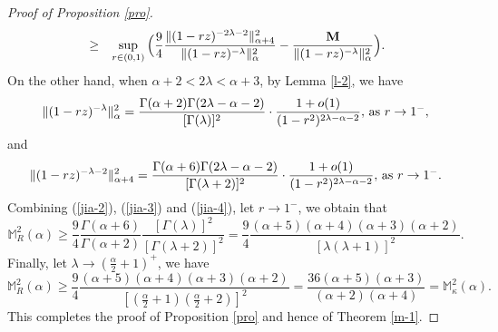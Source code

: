 \documentclass[10pt]{amsart}
\theoremstyle{definition}    %
\numberwithin{equation}{section}
\begin{document}
\begin{proof}[Proof of Proposition \ref{pro}]
\begin{eqnarray}
&\geq &\sup\limits_{r\in (0,1)}\Big(\frac{9}{4}\frac{\|(1-rz)^{-2\lambda-2}\|_{\alpha+4}^2}{\|(1-rz)^{-\lambda}\|_{\alpha}^2}-\frac{{\bf M}}{\|(1-rz)^{-\lambda}\|_{\alpha}^2}\Big).
\end{eqnarray}
On the other hand, when $\alpha+2<2\lambda<\alpha+3$, by Lemma \ref{l-2}, we have
\begin{equation}\label{jia-3}
 \|(1-rz)^{-\lambda}\|_{\alpha}^2=\frac{\Gamma(\alpha+2)\Gamma(2\lambda-\alpha-2)}{[\Gamma(\lambda)]^2}\cdot\frac{1+{o}(1)}{(1-r^2)^{2\lambda-\alpha-2}},\, {\textup{as}}\,\, r\rightarrow 1^{-}, 
\end{equation} 
and 
\begin{equation}\label{jia-4}
 \|(1-rz)^{-\lambda-2}\|_{\alpha+4}^2=\frac{\Gamma(\alpha+6)\Gamma(2\lambda-\alpha-2)}{[\Gamma(\lambda+2)]^2}\cdot\frac{1+{o}(1)}{(1-r^2)^{2\lambda-\alpha-2}},\, {\textup{as}}\,\, r\rightarrow 1^{-}. 
\end{equation} 
Combining (\ref{jia-2}), (\ref{jia-3}) and (\ref{jia-4}), let $r\to 1^{-}$, we obtain that
\begin{equation}
\mathbb{M}_{R}^2(\alpha)  \geq\frac{9}{4}\frac{\Gamma(\alpha+6)}{\Gamma(\alpha+2)}\frac{[\Gamma(\lambda)]^2}{[\Gamma(\lambda+2)]^2}=\frac{9}{4}\frac{(\alpha+5)(\alpha+4)(\alpha+3)(\alpha+2)}{[\lambda(\lambda+1)]^2}.\nonumber 
\end{equation}
Finally, let $\lambda\to (\frac{\alpha}{2}+1)^{+}$, we have 
\begin{equation*}
\mathbb{M}_{R}^2(\alpha) \geq\frac{9}{4}\frac{(\alpha+5)(\alpha+4)(\alpha+3)(\alpha+2)}{[(\frac{\alpha}{2}+1)(\frac{\alpha}{2}+2)]^2}=\frac{36(\alpha+5)(\alpha+3)}{(\alpha+2)(\alpha+4)}=\mathbb{M}_{\kappa}^2(\alpha).
\end{equation*}  
This completes the proof of Proposition \ref{pro} and hence of Theorem \ref{m-1}.
\end{proof}
\end{document}
